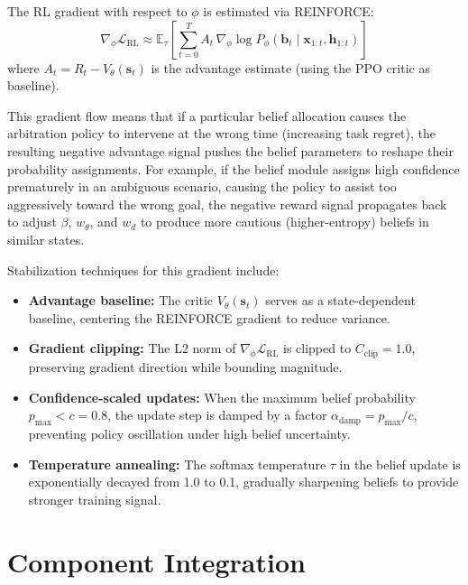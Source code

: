 \documentclass[11pt]{article}
\newcommand{\bvec}{\mathbf{b}_t}
\newcommand{\svec}{\mathbf{s}_t}
\begin{document}
The RL gradient with respect to $\phi$ is estimated via REINFORCE:
\begin{equation}
    \nabla_\phi \mathcal{L}_{\text{RL}} \approx \mathbb{E}_\tau \left[ \sum_{t=0}^{T} A_t \, \nabla_\phi \log P_\phi(\bvec \mid \mathbf{x}_{1:t}, \mathbf{h}_{1:t}) \right]
    \label{eq:reinforce}
\end{equation}
where $A_t = R_t - V_\theta(\svec)$ is the advantage estimate (using the PPO critic as baseline).

This gradient flow means that if a particular belief allocation causes the arbitration policy to intervene at the wrong time (increasing task regret), the resulting negative advantage signal pushes the belief parameters to reshape their probability assignments.
For example, if the belief module assigns high confidence prematurely in an ambiguous scenario, causing the policy to assist too aggressively toward the wrong goal, the negative reward signal propagates back to adjust $\beta$, $w_\theta$, and $w_d$ to produce more cautious (higher-entropy) beliefs in similar states.

Stabilization techniques for this gradient include:
\begin{itemize}
    \item \textbf{Advantage baseline:} The critic $V_\theta(\svec)$ serves as a state-dependent baseline, centering the REINFORCE gradient to reduce variance.
    \item \textbf{Gradient clipping:} The L2 norm of $\nabla_\phi \mathcal{L}_{\text{RL}}$ is clipped to $C_{\text{clip}} = 1.0$, preserving gradient direction while bounding magnitude.
    \item \textbf{Confidence-scaled updates:} When the maximum belief probability $p_{\max} < c = 0.8$, the update step is damped by a factor $\alpha_{\text{damp}} = p_{\max} / c$, preventing policy oscillation under high belief uncertainty.
    \item \textbf{Temperature annealing:} The softmax temperature $\tau$ in the belief update is exponentially decayed from 1.0 to 0.1, gradually sharpening beliefs to provide stronger training signal.
\end{itemize}


\section{Component Integration}
\label{sec:integration}
\end{document}
